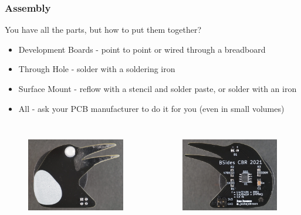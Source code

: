\documentclass[aspectratio=169, t]{beamer}
\begin{document}
\begin{frame}
\frametitle{Assembly}
You have all the parts, but how to put them together?
\begin{itemize}
	\item Development Boards - point to point or wired through a breadboard
	\item Through Hole - solder with a soldering iron
	\item Surface Mount - reflow with a stencil and solder paste, or solder with an iron
	\item All - ask your PCB manufacturer to do it for you (even in small volumes)
\end{itemize}
\vspace{-5mm}
\begin{columns}
	\begin{figure}
		\includegraphics[height=4cm]{images/magpie-front.JPG}
	\end{figure}
	\begin{figure}
		\includegraphics[height=4cm]{images/magpie-back.JPG}
	\end{figure}
\end{columns}
\end{frame}
\end{document}

